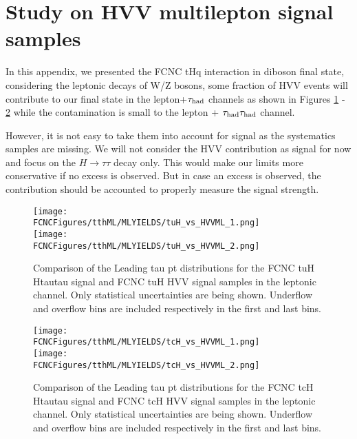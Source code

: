 \section{Study on HVV multilepton signal samples}
\label{sec:HVVML}

In this appendix, we presented the FCNC tHq interaction in diboson final state, considering the leptonic decays of W/Z bosons, some fraction of HVV events will contribute to our final state in the lepton+$\tau_\text{had}$ channels as shown in Figures \ref{fig:check_tuH_HWW} - \ref{fig:check_tcH_HWW} while the contamination is
small to the lepton + $\tau_\text{had}{}\tau_\text{had}$ channel.

However, it is not easy to take them into account for signal as the systematics samples are missing. We will not consider the HVV contribution as signal for now
and focus on the $H\rightarrow \tau\tau$ decay only. This would make our limits more conservative if no excess is observed. But in case an excess is observed, the contribution should be accounted to properly measure the signal strength.



\begin{figure}[htb]
\centering
\texttt{[image: \\FCNCFigures/tthML/MLYIELDS/tuH\_vs\_HVVML\_1.png]}
\\
\texttt{[image: \\FCNCFigures/tthML/MLYIELDS/tuH\_vs\_HVVML\_2.png]}
\\
\caption{ Comparison of the Leading tau pt distributions for the FCNC tuH Htautau signal and FCNC tuH HVV signal samples in the leptonic channel. Only statistical uncertainties are being shown. Underflow and overflow bins are included respectively in the first and last bins.}
\label{fig:check_tuH_HWW}
\end{figure}


\begin{figure}[htb]
\centering
\texttt{[image: \\FCNCFigures/tthML/MLYIELDS/tcH\_vs\_HVVML\_1.png]}
\\
\texttt{[image: \\FCNCFigures/tthML/MLYIELDS/tcH\_vs\_HVVML\_2.png]}
\\
\caption{ Comparison of the Leading tau pt distributions for the FCNC tcH Htautau signal and FCNC tcH HVV signal samples in the leptonic channel. Only statistical uncertainties are being shown. Underflow and overflow bins are included respectively in the first and last bins.}
\label{fig:check_tcH_HWW}
\end{figure}



